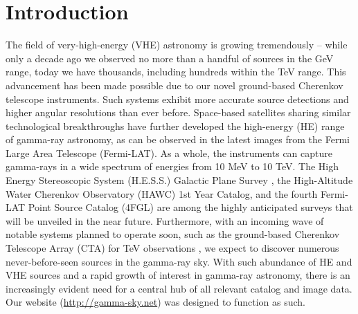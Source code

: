 \section{Introduction}

The field of very-high-energy (VHE) astronomy is growing tremendously – while only a decade ago we observed no more than a handful of sources in the GeV range, today we have thousands, including hundreds within the TeV range. This advancement has been made possible due to our novel ground-based Cherenkov telescope instruments. Such systems exhibit more accurate source detections and higher angular resolutions than ever before. Space-based satellites sharing similar technological breakthroughs have further developed the high-energy (HE) range of gamma-ray astronomy, as can be observed in the latest images from the Fermi Large Area Telescope (Fermi-LAT). As a whole, the instruments can capture gamma-rays in a wide spectrum of energies from 10 MeV to 10 TeV. The High Energy Stereoscopic System (H.E.S.S.) Galactic Plane Survey \cite{hgps}, the High-Altitude Water Cherenkov Observatory (HAWC) 1st Year Catalog, and the fourth Fermi-LAT Point Source Catalog (4FGL) are among the highly anticipated surveys that will be unveiled in the near future. Furthermore, with an incoming wave of notable systems planned to operate soon, such as the ground-based Cherenkov Telescope Array (CTA) for TeV observations \cite{cta}, we expect to discover numerous never-before-seen sources in the gamma-ray sky. With such abundance of HE and VHE sources and a rapid growth of interest in gamma-ray astronomy, there is an increasingly evident need for a central hub of all relevant catalog and image data. Our website (\url{http://gamma-sky.net}) was designed to function as such.

